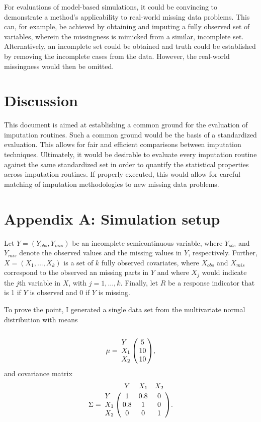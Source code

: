 \documentclass[12pt, a4paper]{article}
\begin{document}
For evaluations of model-based simulations, it could be convincing to demonstrate a method's applicability to real-world missing data problems. This can, for example, be achieved by obtaining and imputing a fully observed set of variables, wherein the missingness is mimicked from a similar, incomplete set. Alternatively, an incomplete set could be obtained and truth could be established by removing the incomplete cases from the data. However, the real-world missingness would then be omitted.

\section*{Discussion}
This document is aimed at establishing a common ground for the evaluation of imputation routines. Such a common ground would be the basis of a standardized evaluation. This allows for fair and efficient comparisons between imputation techniques. Ultimately, it would be desirable to evaluate every imputation routine against the same standardized set in order to quantify the statistical properties across imputation routines. If properly executed, this would allow for careful matching of imputation methodologies to new missing data problems. 

\section*{Appendix A: Simulation setup}
Let $Y=(Y_{obs},Y_{mis})$ be an incomplete semicontinuous variable, where $Y_{obs}$ and $Y_{mis}$ denote the observed values and the missing values in $Y$, respectively.  Further, $X=(X_1,...,X_k)$ is a set of $k$ fully observed covariates, where $X_{obs}$ and $X_{mis}$ correspond to the observed an missing parts in $Y$ and where $X_j$ would indicate the $j$th variable in $X$, with $j=1,\dots, k$. Finally, let $R$ be a response indicator that is 1 if $Y$ is observed and 0 if $Y$ is missing.

To prove the point, I generated a single data set from the multivariate normal distribution with means
\begin{equation*}\label{meanmatrix}
\mu= \bordermatrix{&	 \cr
 Y	&5	\cr
{ X}_1	&10	\cr
{ X}_2	&10	},
\end{equation*}
and covariance matrix
\begin{equation*}\label{covmatrix}
\Sigma = \bordermatrix{& Y &{ X}_1 &{ X}_2	 \cr
 Y	&1	&0.8	&0\cr
{ X}_1	&0.8	&1	&0\cr
{ X}_2	&0	&0	&1}.
\end{equation*}
\end{document}
